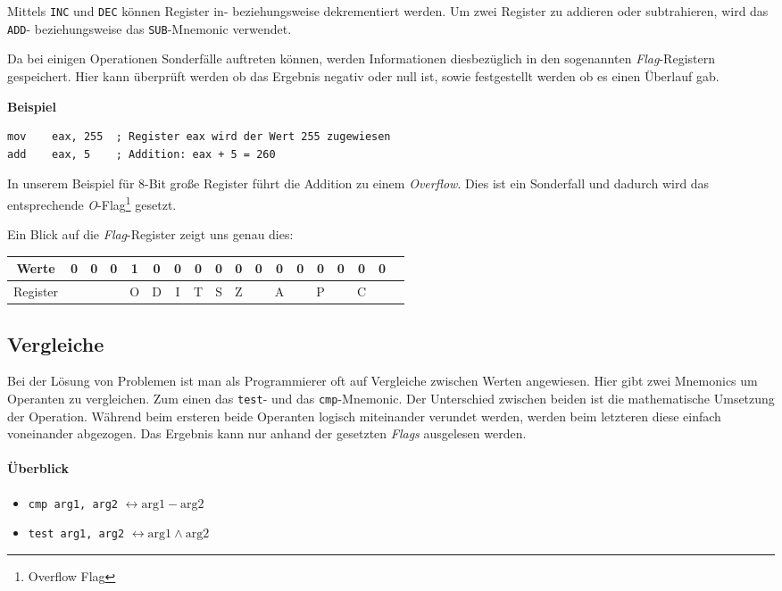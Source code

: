 Mittels \texttt{INC} und \texttt{DEC} können Register in- beziehungsweise dekrementiert werden. Um zwei Register zu addieren oder subtrahieren, wird das \texttt{ADD}- beziehungsweise das \texttt{SUB}-Mnemonic verwendet.

Da bei einigen Operationen Sonderfälle auftreten können, werden Informationen diesbezüglich in den sogenannten \textit{Flag}-Registern gespeichert.
Hier kann überprüft werden ob das Ergebnis negativ oder null ist, sowie festgestellt werden ob es einen Überlauf gab.

\textbf{Beispiel}

\begin{lstlisting}
mov    eax, 255  ; Register eax wird der Wert 255 zugewiesen
add    eax, 5    ; Addition: eax + 5 = 260 
\end{lstlisting}

In unserem Beispiel für 8-Bit große Register führt die Addition zu einem \textit{Overflow}.
Dies ist ein Sonderfall und dadurch wird das entsprechende \textit{O}-Flag\footnote{Overflow Flag} gesetzt.

Ein Blick auf die \textit{Flag}-Register zeigt uns genau dies:

\begin{tabular}{|c|c|c|c|c|c|c|c|c|c|c|c|c|c|c|c|c|c|}
\hline Werte & 0 & 0 & 0 & 1 & 0 & 0 & 0 & 0 & 0 & 0 & 0 & 0 & 0 & 0 & 0 & 0 \\
\hline Register & & & & O & D & I & T & S & Z & & A & & P & & C \\
\hline
\end{tabular}

\subsection{Vergleiche}
Bei der Lösung von Problemen ist man als Programmierer oft auf Vergleiche zwischen Werten angewiesen.
Hier gibt zwei Mnemonics um Operanten zu vergleichen. Zum einen das \texttt{test}- und das \texttt{cmp}-Mnemonic.
Der Unterschied zwischen beiden ist die mathematische Umsetzung der Operation. Während beim ersteren beide Operanten logisch miteinander verundet werden, werden beim letzteren diese einfach voneinander abgezogen. 
Das Ergebnis kann nur anhand der gesetzten \textit{Flags} ausgelesen werden.

\paragraph{Überblick}
\begin{itemize}
	\item \texttt{cmp arg1, arg2} $\leftrightarrow \text{arg1} - \text{arg2}$

	\item \texttt{test arg1, arg2} $\leftrightarrow \text{arg1} \wedge \text{arg2}$
\end{itemize}

